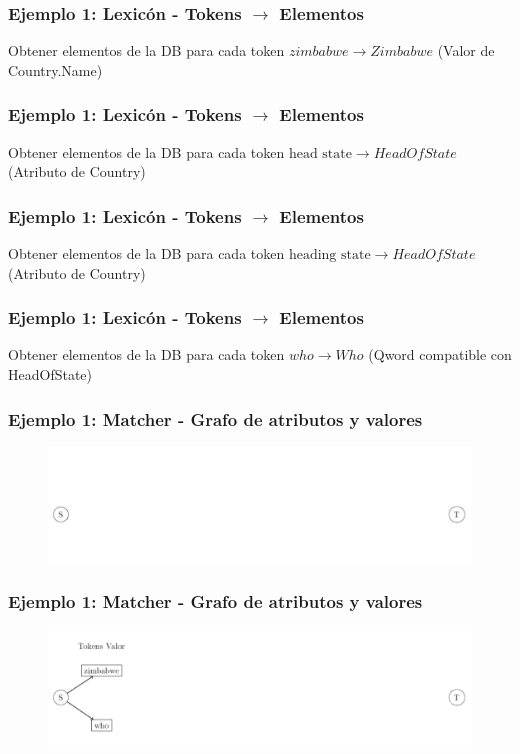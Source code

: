\begin{frame}[t]
\frametitle{Ejemplo 1: Lexicón - Tokens $\rightarrow$ Elementos}
Obtener elementos de la DB para cada token\newline
  \Large{
    $zimbabwe \rightarrow Zimbabwe$ (Valor de Country.Name)
    }
\end{frame}

\begin{frame}[t]
\frametitle{Ejemplo 1: Lexicón - Tokens $\rightarrow$ Elementos}
Obtener elementos de la DB para cada token\newline
  \Large{
    $\text{head state} \rightarrow HeadOfState$ (Atributo de Country)
    }
\end{frame}

\begin{frame}[t]
\frametitle{Ejemplo 1: Lexicón - Tokens $\rightarrow$ Elementos}
Obtener elementos de la DB para cada token\newline
  \Large{
    $\text{heading state} \rightarrow HeadOfState$ (Atributo de Country)
    }
\end{frame}

\begin{frame}[t]
\frametitle{Ejemplo 1: Lexicón - Tokens $\rightarrow$ Elementos}
Obtener elementos de la DB para cada token\newline
  \Large{
    $who \rightarrow Who$ (Qword compatible con HeadOfState)
    }
\end{frame}

\begin{frame}
\frametitle{Ejemplo 1: Matcher - Grafo de atributos y valores}
\begin{figure}
  \centering
    \includegraphics[scale=.33]{graficos/presentacion/ejemplo-grafo-matcher-1-2}
\end{figure}
\end{frame}

\begin{frame}
\frametitle{Ejemplo 1: Matcher - Grafo de atributos y valores}
\begin{figure}
  \centering
    \includegraphics[scale=.33]{graficos/presentacion/ejemplo-grafo-matcher-1-3}
\end{figure}
\end{frame}

